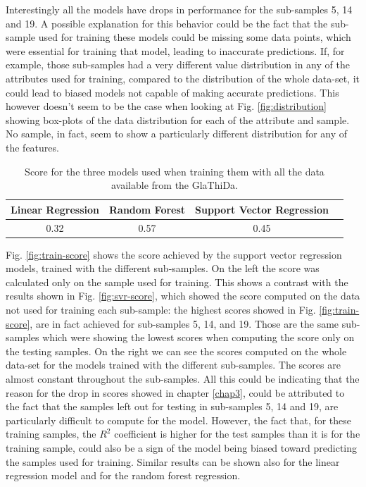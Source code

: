 Interestingly all the models have drops in performance for the sub-samples  5, 14 and 19. A possible explanation for this behavior could be the fact that the sub-sample used for training these models could be missing some data points, which were essential for training that model, leading to inaccurate predictions. If, for example, those sub-samples had a very different value distribution in any of the attributes used for training, compared to the distribution of the whole data-set, it could lead to biased models not capable of making accurate predictions. This however doesn't seem to be the case when looking at Fig. \ref{fig:distribution} showing box-plots of the data distribution for each of the attribute and sample. No sample, in fact, seem to show a particularly different distribution for any of the features.

\begin{table}[!b]
	\centering
	\caption{Score for the three models used when training them with all the data available from the GlaThiDa.}
	\begin{tabular}{|c|c|c|c|}
		\hline 
		Linear Regression&Random Forest&Support Vector Regression \\
		\hline
		0.32&0.57&0.45 \\
		\hline
	\end{tabular}
	\label{tb:all-score}
\end{table}

Fig. \ref{fig:train-score} shows the score achieved by the support vector regression models, trained with the different sub-samples. On the left the score was calculated only on the sample used for training. This shows a contrast with the results shown in Fig. \ref{fig:svr-score}, which showed the score computed on the data not used for training each sub-sample: the highest scores showed in Fig. \ref{fig:train-score}, are in fact achieved for sub-samples 5, 14, and 19. Those are the same sub-samples which were showing the lowest scores when computing the score only on the testing samples. On the right we can see the scores computed on the whole data-set for the models trained with the different sub-samples. The scores are almost constant throughout the sub-samples. All this could be indicating that the reason for the drop in scores showed in chapter \ref{chap3}, could be attributed to the fact that the samples left out for testing in sub-samples 5, 14 and 19, are particularly difficult to compute for the model. However, the fact that, for these training samples, the $R^2$ coefficient is higher for the test samples than it is for the training sample, could also be a sign of the model being biased toward predicting the samples used for training. Similar results can be shown also for the linear regression model and for the random forest regression.

